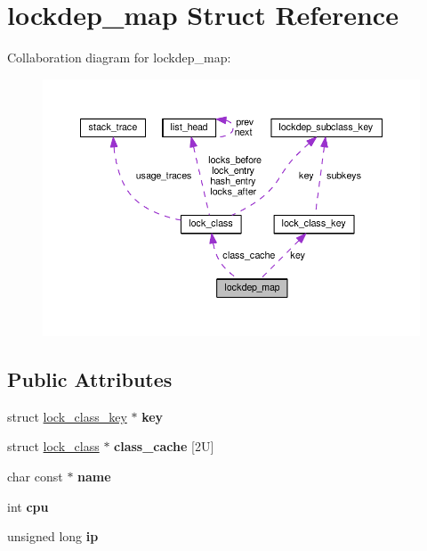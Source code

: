 \hypertarget{structlockdep__map}{}\section{lockdep\+\_\+map Struct Reference}
\label{structlockdep__map}


Collaboration diagram for lockdep\+\_\+map\+:
\nopagebreak
\begin{figure}[H]
\begin{center}
\leavevmode
\includegraphics[width=350pt]{structlockdep__map__coll__graph}
\end{center}
\end{figure}
\subsection*{Public Attributes}
\begin{DoxyCompactItemize}
\item 
\hypertarget{structlockdep__map_ac4205fbd20b15c3823e2600b94f460e9}{}struct \hyperlink{structlock__class__key}{lock\+\_\+class\+\_\+key} $\ast$ {\bfseries key}\label{structlockdep__map_ac4205fbd20b15c3823e2600b94f460e9}

\item 
\hypertarget{structlockdep__map_a58b6186759a43111b4164464d0bf762d}{}struct \hyperlink{structlock__class}{lock\+\_\+class} $\ast$ {\bfseries class\+\_\+cache} \mbox{[}2\+U\mbox{]}\label{structlockdep__map_a58b6186759a43111b4164464d0bf762d}

\item 
\hypertarget{structlockdep__map_ad341c7303472ee29aa36a8470dd3d4a1}{}char const $\ast$ {\bfseries name}\label{structlockdep__map_ad341c7303472ee29aa36a8470dd3d4a1}

\item 
\hypertarget{structlockdep__map_a24c5523294f2b7660d710fd3affcb619}{}int {\bfseries cpu}\label{structlockdep__map_a24c5523294f2b7660d710fd3affcb619}

\item 
\hypertarget{structlockdep__map_a27d354d8915a23f2e159981ea87a9ff9}{}unsigned long {\bfseries ip}\label{structlockdep__map_a27d354d8915a23f2e159981ea87a9ff9}

\end{DoxyCompactItemize}


